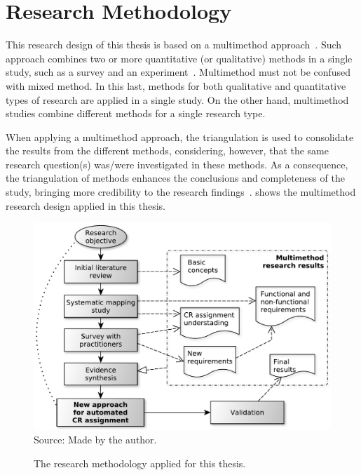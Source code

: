 \section{Research Methodology}

This research design of this thesis is based on a multimethod
approach~\citep{Hesse-Biber2010}. Such approach combines two or more
quantitative (or qualitative) methods in a single study, such as a survey and an
experiment~\citep{Hesse-Biber2010}. Multimethod must not be confused with mixed
method. In this last, methods for both qualitative and quantitative types of
research are applied in a single study. On the other hand, multimethod studies
combine different methods for a single research type.

When applying a multimethod approach, the triangulation is used to consolidate
the results from the different methods, considering, however, that the same
research question(s) was/were investigated in these methods. As a consequence,
the triangulation of methods enhances the conclusions and completeness of the
study, bringing more credibility to the research
findings~\citep{Hesse-Biber2010}.  shows
the multimethod research design applied in this thesis.

\begin{figure}[h]
\centering
  \caption[Research methodology.]{The research methodology applied for this
  thesis.}
  \includegraphics[width=\columnwidth]{images/research-methodology-thesis.pdf}
  \footnotesize{Source: Made by the author.}
  \label{fig:research-methodology-thesis}
\end{figure}

